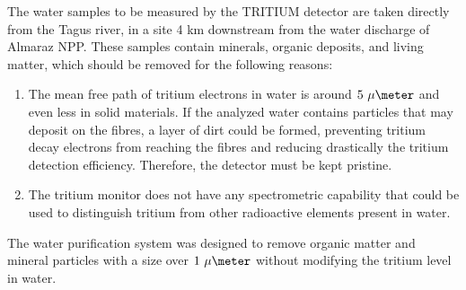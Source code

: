 The water samples to be measured by the TRITIUM detector are taken directly from the Tagus river, in a site 4 km downstream from the water discharge of Almaraz NPP. These samples contain minerals, organic deposits, and living matter, which should be removed for the following reasons:

\begin{enumerate}

\item{} The mean free path of tritium electrons in water is around $5~\mu\meter$ and even less in solid materials. If the analyzed water contains particles that may deposit on the fibres, a layer of dirt could be formed, preventing tritium decay electrons from reaching the fibres and reducing drastically the tritium detection efficiency. Therefore, the detector must be kept pristine.

\item{} The tritium monitor does not have any spectrometric capability that could be used to distinguish tritium from other radioactive elements present in water.

\end{enumerate}

The water purification system was designed to remove organic matter and mineral particles with a size over $1~\mu\meter$ without modifying the tritium level in water. 




